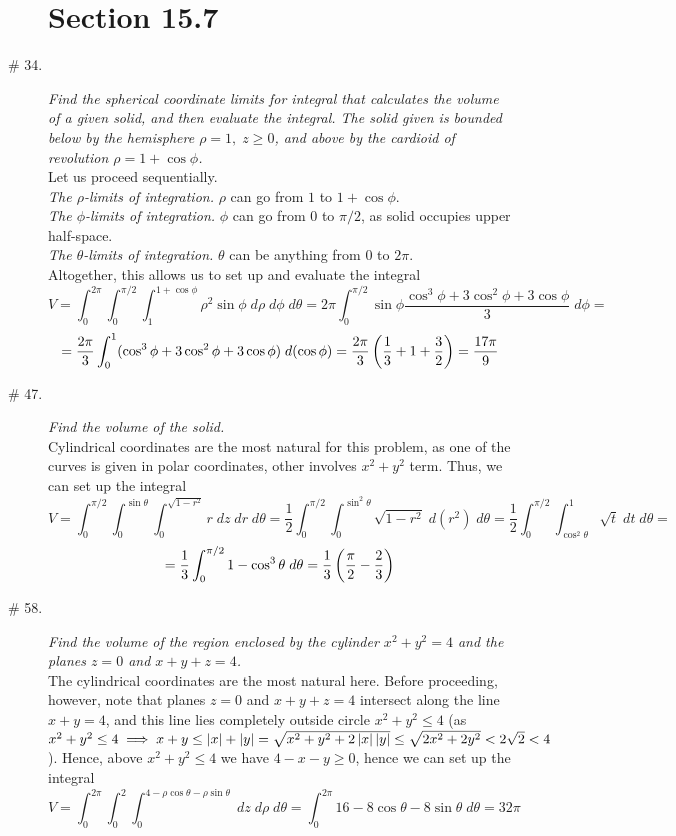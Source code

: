 \documentclass[8pt]{article} %
\newcommand{\dz}{\;dz}
\newcommand{\dr}{\;dr}
\newcommand{\dph}{\;d\phi}
\newcommand{\drh}{\;d\rho}
\newcommand{\dt}{\;d\theta}
\begin{document}
\begin{description}
\section{Section 15.7}
	\item[\# 34.]{{\it Find the spherical coordinate limits for integral that calculates the volume of a given solid, and then
		evaluate the integral. The solid given is bounded below by the hemisphere $\rho=1,\;z\geq0$, and above by the
		cardioid of revolution $\rho=1+\cos\phi$.}\\
		Let us proceed sequentially.\\
		{\it The $\rho$-limits of integration.} $\rho$ can go from $1$ to $1+\cos\phi$.\\
		{\it The $\phi$-limits of integration.} $\phi$ can go from $0$ to $\pi/2$, as solid occupies upper half-space.\\
		{\it The $\theta$-limits of integration.} $\theta$ can be anything from $0$ to $2\pi$.\\
		Altogether, this allows us to set up and evaluate the integral
		\[V=\int_0^{2\pi}\int_0^{\pi/2}\int_1^{1+\cos\phi}\rho^2\sin\phi\drh\dph\dt=2\pi\int_0^{\pi/2}\sin\phi\frac
		{\cos^3\phi+3\cos^2\phi+3\cos\phi}{3}\dph=\]
		\[=\frac{2\pi}{3}\int_0^1(\cos^3\phi+3\cos^2\phi+3\cos\phi)\;d(\cos\phi)=\frac{2\pi}{3}\left(\frac{1}{3}+1+\frac{3}
		{2}\right)=\frac{17\pi}{9}\]
		}
	\item[\# 47.]{{\it Find the volume of the solid.\\}
		Cylindrical coordinates are the most natural for this problem, as one of the curves is given in polar coordinates,
		other involves $x^2+y^2$ term. Thus, we can set up the integral
		\[V=\int_0^{\pi/2}\int_0^{\sin\theta}\int_0^{\sqrt{1-r^2}}r\dz\dr\dt=\frac{1}{2}\int_0^{\pi/2}\int_0^{\sin^2\theta}
		\sqrt{1-r^2}\;d(r^2)\dt=\frac{1}{2}\int_0^{\pi/2}\int_{\cos^2\theta}^1\sqrt t\;dt\dt=\]
		\[=\frac{1}{3}\int_0^{\pi/2}1-\cos^3\theta\dt=\frac{1}{3}\mybra{\frac{\pi}{2}-\frac{2}{3}}\]
		}
	\item[\# 58.]{{\it Find the volume of the region enclosed by the cylinder $x^2+y^2=4$ and the planes $z=0$ and $x+y+z=4$.}\\
		The cylindrical coordinates are the most natural here. Before proceeding, however, note that planes $z=0$
		and $x+y+z=4$ intersect along the line $x+y=4$, and this line lies completely outside circle $x^2+y^2\leq 4$ (as
		$x^2+y^2\leq 4\implies x+y\leq\left|x\right|+\left|y\right|=\sqrt{x^2+y^2+2\left|x\right|\left|y\right|}\leq \sqrt{2x^2+2y^2}<2\sqrt{2}<4$
		). Hence, above $x^2+y^2\leq 4$ we have $4-x-y\geq 0$, hence we can set up the integral
		\[V=\int_0^{2\pi}\int_0^2\int_0^{4-\rho\cos\theta-\rho\sin\theta}\dz\drh\dt=\int_0^{2\pi}16-8\cos\theta-8\sin\theta\dt
		=32\pi\]
		}

\end{description}
\end{document}
